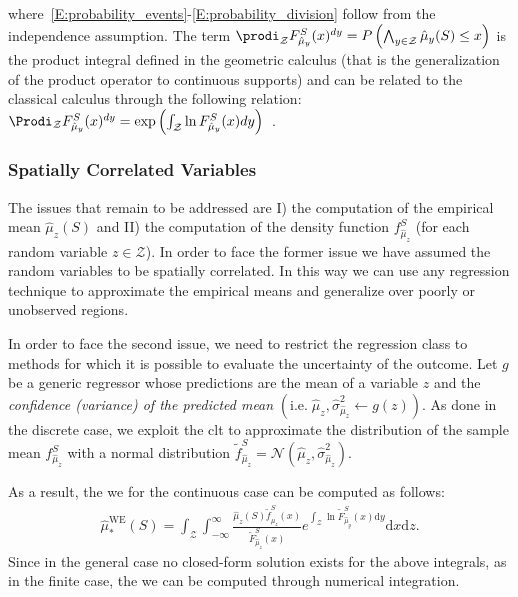 \noindent where~\ref{E:probability_events}-\ref{E:probability_division} follow from the independence assumption.
The term $\prodi_{\mathcal{Z}} F^S_{\hat{\mu}_y}(x)^{dy} = P \left( \bigwedge_{y \in \mathcal{Z}} \hat{\mu}_y(S) \leq x \right)$ is the product integral defined in the geometric calculus (that is the generalization of the product operator to continuous supports) and can be related to the classical calculus through the following relation: $\Prodi_{\mathcal{Z}} F_{\hat{\mu}_y}^S(x)^{dy} = \exp{\left( \int_{\mathcal{Z}} \ln F_{\hat{\mu}_y}^S(x)dy \right)}$~\cite{grossman1972non}.

\subsubsection{Spatially Correlated Variables}
The issues that remain to be addressed are I) the computation of the empirical mean $\hat{\mu}_z(S)$ and II) the computation of the density function $f_{\hat{\mu}_z}^S$ (for each random variable $z \in \mathcal{Z}$).
In order to face the former issue we have assumed the random variables to be spatially correlated.
In this way we can use any regression technique to approximate the empirical means and generalize over poorly or unobserved regions.

In order to face the second issue, we need to restrict the regression class to methods for which it is possible to evaluate the uncertainty of the outcome.
Let $g$ be a generic regressor whose predictions are the mean of a variable $z$ and the \emph{confidence (variance) of the predicted mean} $\left(\text{i.e.}\; \hat{\mu}_z, \hat{\sigma}_{\hat{\mu}_z}^2 \leftarrow g(z) \right)$.
As done in the discrete case, we exploit the \gls{clt} to approximate the distribution of the sample mean $f_{\hat{\mu}_z}^S$ with a normal distribution $\tilde{f}_{\hat{\mu}_z}^S = \mathcal{N}\left(\hat{\mu}_z, \hat{\sigma}^2_{\hat{\mu}_z} \right)$.

As a result, the \gls{we} for the continuous case can be computed as follows:
\begin{align}\label{E:continuousWE2}
\hat{\mu}_*^{\textrm{WE}}(S) = \int_{\mathcal{Z}} \int_{-\infty}^{\infty}  \frac{\hat{\mu}_z(S)  \tilde{f}_{\hat{\mu}_z}^S(x)}{\tilde{F}_{\hat{\mu}_z}^S(x)} e^{\int_{\mathcal{Z}} \ln \tilde{F}_{\hat{\mu}_y}^S(x)\mathrm{d}y}\mathrm{d}x\mathrm{d}z.
\end{align}
Since in the general case no closed-form solution exists for the above integrals, as in the finite case, the \gls{we} can be computed through numerical integration.

